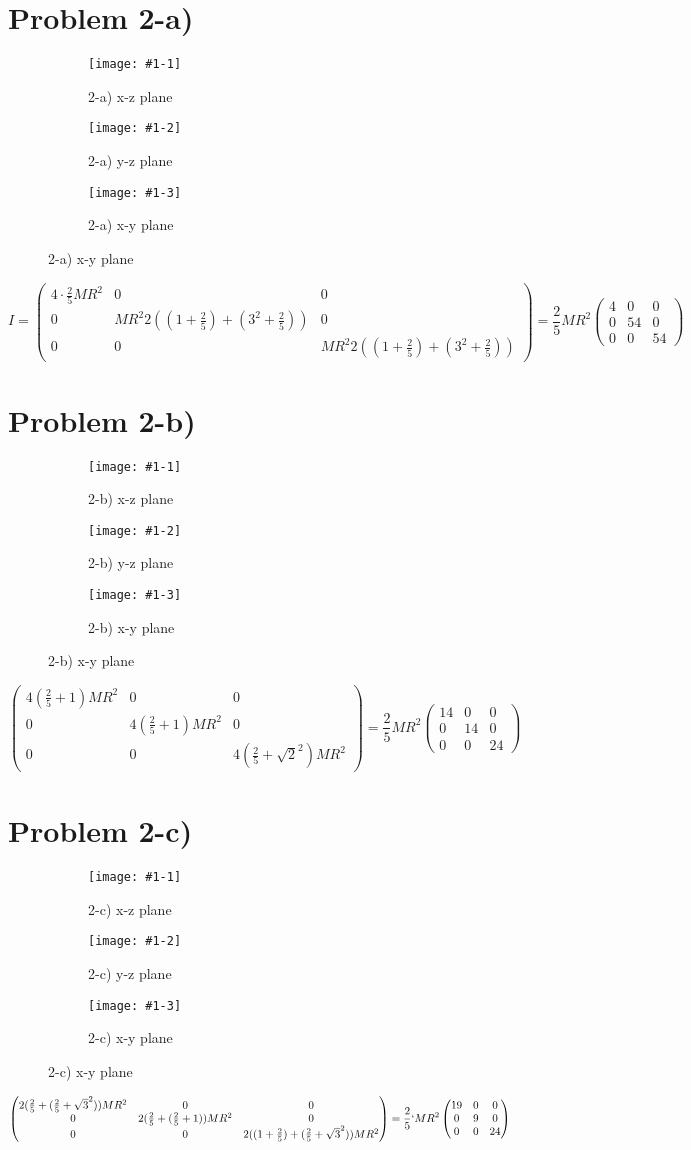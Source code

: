 \section*{Problem 2-a)}
\newcommand{\graphss}[3]{
\begin{figure}[h]
\centering
\begin{subfigure}[b]{0.30\textwidth}
\texttt{[image: \#1-1]}
\label{fig:#1-1}
\caption{#2 x-z plane}
\end{subfigure}
\begin{subfigure}[b]{0.30\textwidth}
\texttt{[image: \#1-2]}
\label{fig:#1-2}
\caption{#2 y-z plane}
\end{subfigure}
\begin{subfigure}[b]{0.30\textwidth}
\texttt{[image: \#1-3]}
\label{fig:#1-3}
\caption{#2 x-y plane}
\end{subfigure}
#3
\end{figure}
}
\newcommand{\graphs}[2]{\graphss{#1}{ #2 }{}}
\graphs{A1}{2-a)}
\[I = \begin{pmatrix}4\cdot\frac{2}{5}MR^2 & 0 & 0 \\
0 & MR^2 2((1+\frac{2}{5})+(3^2+\frac{2}{5})) & 0 \\
0 & 0 & MR^2 2((1+\frac{2}{5})+(3^2+\frac{2}{5})) 
\end{pmatrix} = \frac{2}{5}MR^2 \begin{pmatrix} 4 & 0 & 0\\
0 & 54 & 0 \\
0 & 0 & 54 \end{pmatrix}\]
\section*{Problem 2-b)}
\graphs{A2}{2-b)}
\[ \begin{pmatrix} 4 (\frac{2}{5} + 1) MR^2 & 0 & 0 \\
0 & 4 (\frac{2}{5} + 1) MR^2 & 0 \\
0 & 0 & 4 (\frac{2}{5} + \sqrt{2}^2) MR^2
\end{pmatrix} = \frac{2}{5}MR^2 \begin{pmatrix} 14 & 0 & 0\\
0 & 14 & 0 \\
0 & 0 & 24 \end{pmatrix}\]
\section*{Problem 2-c)}
\graphs{A3}{2-c)}
\[ \begin{pmatrix} 2 (\frac{2}{5} + (\frac{2}{5}+\sqrt{3}^2)) MR^2 & 0 & 0 \\
0 & 2(\frac{2}{5} + (\frac{2}{5}+1)) MR^2 & 0 \\
0 & 0 & 2 ((1+\frac{2}{5}) + (\frac{2}{5}+\sqrt{3}^2)) MR^2
\end{pmatrix} = \frac{2}{5} 	`MR^2 \begin{pmatrix} 19 & 0 & 0\\
0 & 9 & 0 \\
0 & 0 & 24\end{pmatrix}\]
